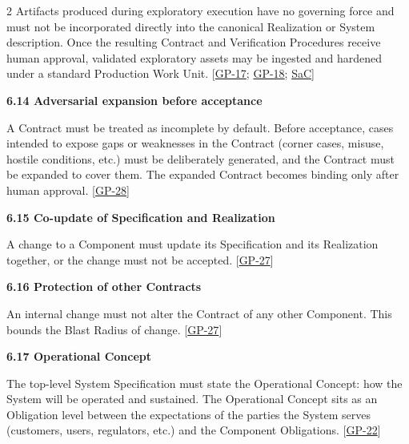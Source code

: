 \begin{multicols}{2}
Artifacts produced during exploratory execution have no governing force and must not be incorporated directly into the canonical Realization or System description. Once the resulting Contract and Verification Procedures receive human approval, validated exploratory assets may be ingested and hardened under a standard Production Work Unit. [\hyperlink{gp-17}{GP-17}; \hyperlink{gp-18}{GP-18}; \hyperlink{gp-SaC}{SaC}]

\hypertarget{nss-6.14}{}

\par\smallskip\noindent\textbf{6.14 Adversarial expansion before acceptance}\par\nopagebreak

A Contract must be treated as incomplete by default. Before acceptance, cases intended to expose gaps or weaknesses in the Contract (corner cases, misuse, hostile conditions, etc.) must be deliberately generated, and the Contract must be expanded to cover them. The expanded Contract becomes binding only after human approval. [\hyperlink{gp-28}{GP-28}]

\hypertarget{nss-6.15}{}

\par\smallskip\noindent\textbf{6.15 Co-update of Specification and Realization}\par\nopagebreak

A change to a Component must update its Specification and its Realization together, or the change must not be accepted. [\hyperlink{gp-27}{GP-27}]

\hypertarget{nss-6.16}{}

\par\smallskip\noindent\textbf{6.16 Protection of other Contracts}\par\nopagebreak

An internal change must not alter the Contract of any other Component. This bounds the Blast Radius of change. [\hyperlink{gp-27}{GP-27}]

\hypertarget{nss-6.17}{}

\par\smallskip\noindent\textbf{6.17 Operational Concept}\par\nopagebreak

The top-level System Specification must state the Operational Concept: how the System will be operated and sustained. The Operational Concept sits as an Obligation level between the expectations of the parties the System serves (customers, users, regulators, etc.) and the Component Obligations. [\hyperlink{gp-22}{GP-22}]


\end{multicols}
